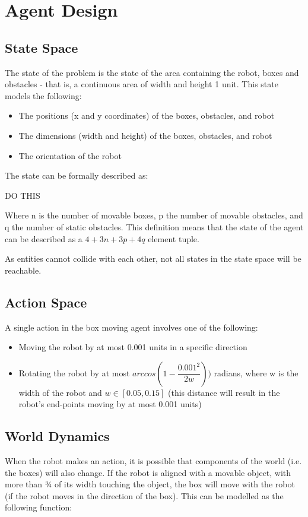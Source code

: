 \section{Agent Design}

\subsection{State Space}
The state of the problem is the state of the area containing the robot,
boxes and obstacles - that is, a continuous area of width and height 1 unit.
This state models the following:

\begin{itemize}
\item The positions (x and y coordinates) of the boxes, obstacles, and robot
\item The dimensions (width and height) of the boxes, obstacles, and robot
\item The orientation of the robot
\end{itemize}

The state can be formally described as:

DO THIS

Where n is the number of movable boxes, p the number of movable obstacles, and
q the number of static obstacles. This definition means that the state of the
agent can be described as a $4 + 3n + 3p + 4q$ element tuple.

As entities cannot collide with each other, not all states in the state space will be reachable.


\subsection{Action Space}
A single action in the box moving agent involves one of the following:

\begin{itemize}
\item Moving the robot by at most 0.001 units in a specific direction
\item Rotating the robot by at most $arccos(1-\dfrac{0.001^2}{2w}))$ radians,
      where w is the width of the robot and $w \in [0.05,0.15]$ (this distance will
      result in the robot’s end-points moving by at most 0.001 units)
\end{itemize}


\subsection{World Dynamics}
When the robot makes an action, it is possible that components of the world
(i.e. the boxes) will also change.
If the robot is aligned with a movable object, with more than ¾ of its width
touching the object, the box will move with the robot
(if the robot moves in the direction of the box).
This can be modelled as the following function:

